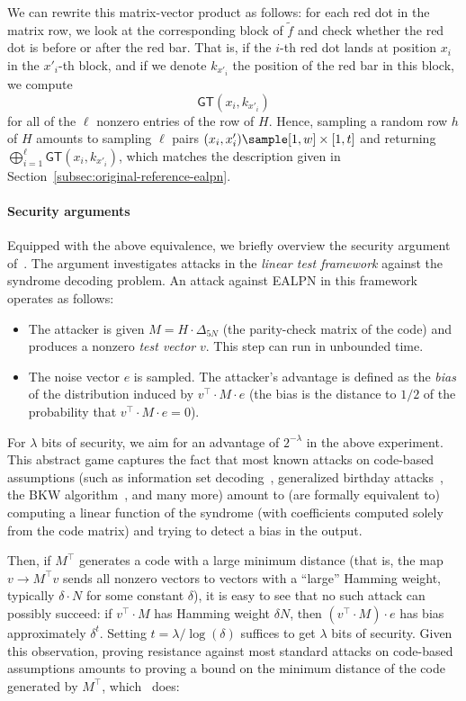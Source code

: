 \documentclass[journal=tosc,submission]{iacrtrans}
\theoremstyle{theorem}
\renewcommand\secpar{\ensuremath{\lambda}\xspace}
\newcommand\GT{\ensuremath{\mathsf{GT}}\xspace}
\begin{document}
We can rewrite this matrix-vector product as follows: for each red dot in the matrix row, we look at the corresponding block of $\tilde f$ and check whether the red dot is before or after the red bar. That is, if the $i$-th red dot lands at position $x_i$ in the $x'_i$-th block, and if we denote $k_{x'_i}$ the position of the red bar in this block, we compute
\[\GT(x_i, k_{x'_i})\]
for all of the $\ell$ nonzero entries of the row of $H$. Hence, sampling a random row $h$ of $H$ amounts to sampling $\ell$ pairs $(x_i, x'_i) \sample [1,w]\times [1,t]$ and returning
$\bigoplus_{i=1}^\ell \GT(x_i, k_{x'_i})$,
which matches the description given in Section~\ref{subsec:original-reference-ealpn}.

\paragraph{Security arguments} Equipped with the above equivalence, we briefly overview the security argument of~\cite{C:BCGIKR22}. The argument investigates attacks in the \emph{linear test framework} against the syndrome decoding problem. An attack against {\sf EALPN} in this framework operates as follows:
\begin{itemize}
	\item The attacker is given $M = H\cdot \Delta_{5N}$ (the parity-check matrix of the code) and produces a nonzero \emph{test vector} $v$. This step can run in unbounded time.
	\item The noise vector $e$ is sampled. The attacker's advantage is defined as the \emph{bias} of the distribution induced by $v^\intercal\cdot M\cdot e$ (the bias is the distance to $1/2$ of the probability that $v^\intercal\cdot M\cdot e = 0$).
\end{itemize}
For $\secpar$ bits of security, we aim for an advantage of $2^{-\secpar}$ in the above experiment. This abstract game captures the fact that most known attacks on code-based assumptions (such as information set decoding~\cite{Prange62}, generalized birthday attacks~\cite{C:Wagner02,EPRINT:Kirchner11}, the BKW algorithm~\cite{STOC:BluKalWas00,AR:L05}, and many more) amount to (are formally equivalent to) computing a linear function of the syndrome (with coefficients computed solely from the code matrix) and trying to detect a bias in the output.

Then, if $M^\intercal$ generates a code with a large minimum distance (that is, the map $v \to M^\intercal v$ sends all nonzero vectors to vectors with a ``large'' Hamming weight, typically $\delta \cdot N$ for some constant $\delta$), it is easy to see that no such attack can possibly succeed: if $v^\intercal\cdot M$ has Hamming weight $\delta N$, then $(v^\intercal\cdot M)\cdot e$ has bias approximately $\delta^t$. Setting $t= \secpar/ \log(\delta)$ suffices to get $\secpar$ bits of security. Given this observation, proving resistance against most standard attacks on code-based assumptions amounts to proving a bound on the minimum distance of the code generated by $M^\intercal$, which~\cite{C:BCGIKR22} does:
\end{document}
